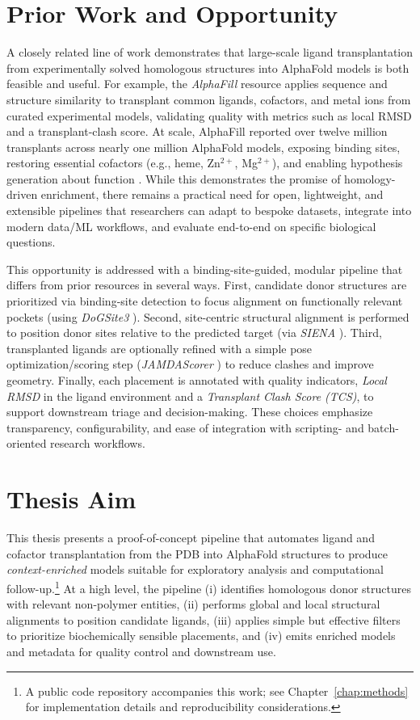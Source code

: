 \section{Prior Work and Opportunity}
A closely related line of work demonstrates that large-scale ligand transplantation from experimentally solved homologous structures into AlphaFold models is both feasible and useful. For example, the \textit{AlphaFill} resource applies sequence and structure similarity to transplant common ligands, cofactors, and metal ions from curated experimental models, validating quality with metrics such as local RMSD and a transplant-clash score. At scale, AlphaFill reported over twelve million transplants across nearly one million AlphaFold models, exposing binding sites, restoring essential cofactors (e.g., heme, Zn$^{2+}$, Mg$^{2+}$), and enabling hypothesis generation about function \cite{hekkelmanAlphaFillEnrichingAlphaFold2023}. While this demonstrates the promise of homology-driven enrichment, there remains a practical need for open, lightweight, and extensible pipelines that researchers can adapt to bespoke datasets, integrate into modern data/ML workflows, and evaluate end-to-end on specific biological questions.

This opportunity is addressed with a binding-site-guided, modular pipeline that differs from prior resources in several ways. First, candidate donor structures are prioritized via binding-site detection to focus alignment on functionally relevant pockets (using \emph{DoGSite3} \cite{graefBindingSiteDetection2023}). Second, site-centric structural alignment is performed to position donor sites relative to the predicted target (via \emph{SIENA} \cite{bietzSIENAEfficientCompilation2016}). Third, transplanted ligands are optionally refined with a simple pose optimization/scoring step (\emph{JAMDAScorer} \cite{flachsenbergConsistentSchemeGradientBased2020}) to reduce clashes and improve geometry. Finally, each placement is annotated with quality indicators, \emph{Local RMSD} in the ligand environment and a \emph{Transplant Clash Score (TCS)}, to support downstream triage and decision-making. These choices emphasize transparency, configurability, and ease of integration with scripting- and batch-oriented research workflows.

\section{Thesis Aim}
This thesis presents a proof-of-concept pipeline that automates ligand and cofactor transplantation from the PDB into AlphaFold structures to produce \emph{context-enriched} models suitable for exploratory analysis and computational follow-up.\footnote{A public code repository accompanies this work; see Chapter~\ref{chap:methods} for implementation details and reproducibility considerations.} At a high level, the pipeline (i) identifies homologous donor structures with relevant non-polymer entities, (ii) performs global and local structural alignments to position candidate ligands, (iii) applies simple but effective filters to prioritize biochemically sensible placements, and (iv) emits enriched models and metadata for quality control and downstream use.

